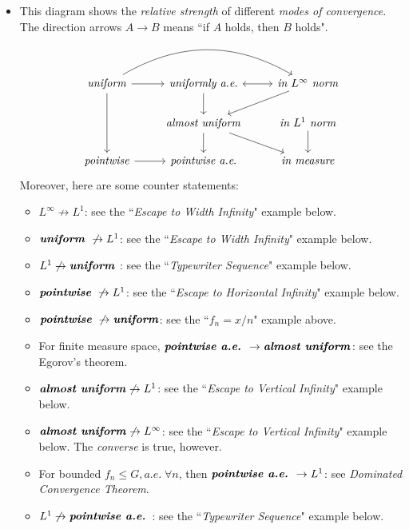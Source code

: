 \documentclass[11pt]{article}
\begin{document}
\begin{itemize}
\item \begin{remark} This diagram shows the \emph{relative strength} of different \emph{modes of convergence}. The direction arrows $A \rightarrow B$ means ``if $A$ holds, then $B$ holds".
\[
  \begin{tikzcd}
     \text{\emph{uniform}} \arrow{dd}{}  \arrow{r}{}  \arrow[rr, swap, bend left] & \text{\emph{uniformly a.e.}}  \arrow{d}{} & \arrow[l, leftrightarrow] \text{\emph{in $L^{\infty}$ norm}} \arrow{dl}{} \\
      & \text{\emph{almost uniform}}  \arrow{d}{} \arrow{dr}{} &  \text{\emph{in $L^{1}$ norm}} \arrow{d}{} \\
    \text{\emph{pointwise}}  \arrow{r}{} &   \text{\emph{pointwise a.e}.} & \text{\emph{in measure}}
  \end{tikzcd}
\] 
Moreover, here are some counter statements:
\begin{itemize}
\item $L^{\infty} \not\rightarrow L^{1}$: see the ``\emph{Escape to Width Infinity}" example below.
\item $\text{\emph{\textbf{uniform}} } \not\rightarrow L^{1}$: see the ``\emph{Escape to Width Infinity}" example below.
\item $L^{1}  \not\rightarrow \text{\emph{\textbf{uniform}} }$: see the ``\emph{Typewriter Sequence}" example below.
\item $\text{\emph{\textbf{pointwise}} } \not\rightarrow L^{1}$: see the ``\emph{Escape to Horizontal Infinity}" example below.
\item $\text{\emph{\textbf{pointwise}} } \not\rightarrow \text{\emph{\textbf{uniform}}}$: see the ``$f_n = x/n$" example above.
\item For finite measure space, $\text{\emph{\textbf{pointwise a.e.}} } \rightarrow \text{\emph{\textbf{almost uniform}}}$: see the Egorov's theorem.
\item $\text{\emph{\textbf{almost uniform}}}  \not\rightarrow L^{1}$: see the ``\emph{Escape to Vertical Infinity}" example below.
\item $\text{\emph{\textbf{almost uniform}}}  \not\rightarrow L^{\infty}$: see the ``\emph{Escape to Vertical Infinity}" example below. The \emph{converse} is true, however.
\item For bounded $f_n \le G, a.e.\; \forall n$, then $\text{\emph{\textbf{pointwise a.e.}} } \rightarrow L^{1}$: see \emph{Dominated Convergence Theorem}. 
\item $L^{1}  \not\rightarrow \text{\emph{\textbf{pointwise a.e.}} }$: see the ``\emph{Typewriter Sequence}" example below.

\end{itemize}
\end{remark}
\end{itemize}
\end{document}
